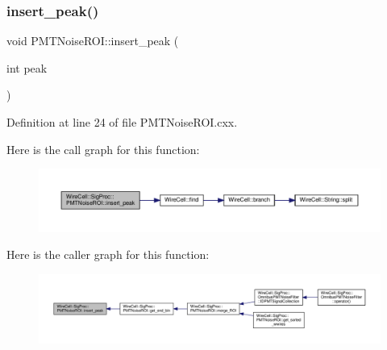 \mbox{\label{class_wire_cell_1_1_sig_proc_1_1_p_m_t_noise_r_o_i_ab7da8d38dd37b3f81e064a9970e581f8}} 
\subsubsection{\texorpdfstring{insert\+\_\+peak()}{insert\_peak()}}
{\footnotesize\ttfamily void P\+M\+T\+Noise\+R\+O\+I\+::insert\+\_\+peak (\begin{DoxyParamCaption}\item[{int}]{peak }\end{DoxyParamCaption})}



Definition at line 24 of file P\+M\+T\+Noise\+R\+O\+I.\+cxx.

Here is the call graph for this function\+:
\nopagebreak
\begin{figure}[H]
\begin{center}
\leavevmode
\includegraphics[width=350pt]{class_wire_cell_1_1_sig_proc_1_1_p_m_t_noise_r_o_i_ab7da8d38dd37b3f81e064a9970e581f8_cgraph}
\end{center}
\end{figure}
Here is the caller graph for this function\+:
\nopagebreak
\begin{figure}[H]
\begin{center}
\leavevmode
\includegraphics[width=350pt]{class_wire_cell_1_1_sig_proc_1_1_p_m_t_noise_r_o_i_ab7da8d38dd37b3f81e064a9970e581f8_icgraph}
\end{center}
\end{figure}
\mbox{\label{class_wire_cell_1_1_sig_proc_1_1_p_m_t_noise_r_o_i_a97674ed5490b45c6e8e72292ee4012e7}} 
